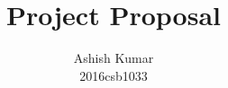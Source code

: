\documentclass[journal]{IEEEtran}
\begin{document}
\title{Project Proposal}

\author{

Ashish Kumar\\
2016csb1033

}

\maketitle
\end{document}
